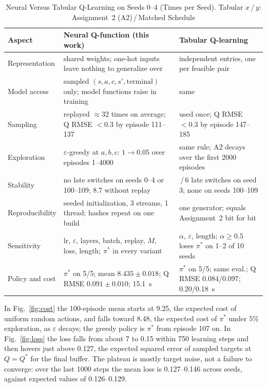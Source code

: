 \documentclass[conference]{IEEEtran}
\begin{document}
\begin{table}[t]
\caption{Neural Versus Tabular Q-Learning on Seeds 0--4 (Times per Seed). Tabular
$x$\,/\,$y$: Assignment~2 (A2)\,/\,Matched Schedule}
\label{tab:compare}
\centering\footnotesize
\begin{tabularx}{\textwidth}{@{}l >{\raggedright\arraybackslash\hsize=1.12\hsize}X
>{\raggedright\arraybackslash\hsize=0.88\hsize}X@{}}
\toprule
Aspect & Neural Q-function (this work) & Tabular Q-learning\\
\midrule
Representation & 1575 shared weights; one-hot inputs leave nothing to generalize over & 10 independent entries, one per feasible pair\\
Model access & sampled $(s,a,c,s',\text{terminal})$ only; model functions raise in training & same\\
Sampling & replayed $\approx$32 times on average; Q RMSE $<0.3$ by episode 111--137 & used once; Q RMSE $<0.3$ by episode 147--185\\
Exploration & $\varepsilon$-greedy at $a,b,c$: $1\to0.05$ over episodes 1--4000 & same rule; A2 decays over the first 2000 episodes\\
Stability & no late switches on seeds 0--4 or 100--109; 8.7 without replay & 2\,/\,6 late switches on seed 3; none on seeds 100--109\\
Reproducibility & seeded initialization, 3 streams, 1 thread; hashes repeat on one build & one generator; equals Assignment~2 bit for bit\\
Sensitivity & lr, $\varepsilon$, layers, batch, replay, $M$, loss, length; $\pi^*$ in every variant & $\alpha$, $\varepsilon$, length; $\alpha\ge0.5$ loses $\pi^*$ on 1--2 of 10 seeds\\
Policy and cost & $\pi^*$ on 5/5; mean $8.435\pm0.018$; Q RMSE $0.091\pm0.010$; 15.1~s &$\pi^*$ on 5/5; same eval.; Q RMSE 0.084/0.097; 0.20/0.18~s\\
\bottomrule
\end{tabularx}
\end{table}

In Fig.~\ref{fig:cost} the 100-episode mean starts at 9.25, the expected cost of uniform
random actions, and falls toward 8.48, the expected cost of $\pi^*$ under 5\% exploration, as
$\varepsilon$ decays; the greedy policy is $\pi^*$ from episode 107 on. In Fig.~\ref{fig:loss}
the loss falls from about 7 to 0.15 within 750 learning steps and then hovers just above 0.127,
the expected squared error of sampled targets at $Q=Q^*$ for the final buffer. The plateau is
mostly target noise, not a failure to converge: over the last 1000 steps the mean loss is
0.127--0.146 across seeds, against expected values of 0.126--0.129.
\end{document}
